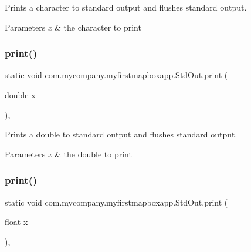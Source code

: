 Prints a character to standard output and flushes standard output.


\begin{DoxyParams}{Parameters}
{\em x} & the character to print \\
\hline
\end{DoxyParams}
\mbox{\label{classcom_1_1mycompany_1_1myfirstmapboxapp_1_1_std_out_a6386ccdca565c0b2fbfe4f88cff27696}} 
\subsubsection{\texorpdfstring{print()}{print()}\hspace{0.1cm}{\footnotesize\ttfamily [5/10]}}
{\footnotesize\ttfamily static void com.\+mycompany.\+myfirstmapboxapp.\+Std\+Out.\+print (\begin{DoxyParamCaption}\item[{double}]{x }\end{DoxyParamCaption})\hspace{0.3cm}{\ttfamily [inline]}, {\ttfamily [static]}}

Prints a double to standard output and flushes standard output.


\begin{DoxyParams}{Parameters}
{\em x} & the double to print \\
\hline
\end{DoxyParams}
\mbox{\label{classcom_1_1mycompany_1_1myfirstmapboxapp_1_1_std_out_a73dfd4542e29d8fc61b3df443f2a84a0}} 
\subsubsection{\texorpdfstring{print()}{print()}\hspace{0.1cm}{\footnotesize\ttfamily [6/10]}}
{\footnotesize\ttfamily static void com.\+mycompany.\+myfirstmapboxapp.\+Std\+Out.\+print (\begin{DoxyParamCaption}\item[{float}]{x }\end{DoxyParamCaption})\hspace{0.3cm}{\ttfamily [inline]}, {\ttfamily [static]}}

